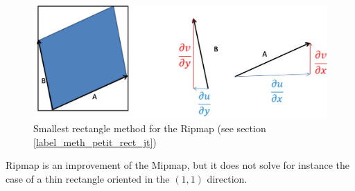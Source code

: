 \label{label_meth_petit_rect_jt}
\begin{figure}[h!]
\centering
\includegraphics[scale=0.5]{methode_distance_ripmap.jpg}
\caption{Smallest rectangle method for the Ripmap (see section \ref{label_meth_petit_rect_jt})}
\label{methode_distance_ripmap}
\end{figure}

Ripmap is an improvement of the Mipmap, but it does not solve for instance the case of a thin rectangle oriented in the $(1,1)$ direction.


